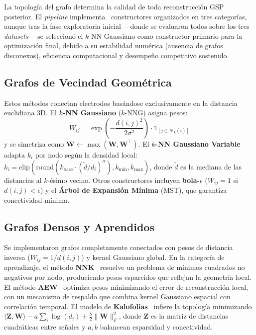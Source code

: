 La topología del grafo determina la calidad de toda reconstrucción GSP posterior. El \textit{pipeline} implementa \ResNGraphMethods~constructores organizados en tres categorías, aunque tras la fase exploratoria inicial —donde se evaluaron todos sobre los tres \textit{datasets}— se seleccionó el $k$-NN Gaussiano como constructor primario para la optimización final, debido a su estabilidad numérica (ausencia de grafos disconexos), eficiencia computacional y desempeño competitivo sostenido.

\subsection{Grafos de Vecindad Geométrica}

Estos métodos conectan electrodos basándose exclusivamente en la distancia euclidiana 3D. El \textbf{$k$-NN Gaussiano} ($k$-NNG) asigna pesos:
\begin{equation}
    W_{ij} = \exp\!\left(-\frac{d(i,j)^2}{2\sigma^2}\right) \cdot \mathbb{1}_{[j \in \mathcal{N}_k(i)]}
\end{equation}
y se simetriza como $\mathbf{W} \leftarrow \max(\mathbf{W}, \mathbf{W}^\top)$. El \textbf{$k$-NN Gaussiano Variable}~\cite{tamaru_optimizing_2024} adapta $k_i$ por nodo según la densidad local: $k_i = \text{clip}(\text{round}(k_{\text{base}} \cdot (\tilde{d}/d_i)^\alpha), k_{\min}, k_{\max})$, donde $\tilde{d}$ es la mediana de las distancias al $k$-ésimo vecino. Otros constructores incluyen \textbf{bola-$\epsilon$} ($W_{ij} = 1$ si $d(i,j) < \epsilon$) y el \textbf{Árbol de Expansión Mínima} (MST), que garantiza conectividad mínima.

\subsection{Grafos Densos y Aprendidos}

Se implementaron grafos completamente conectados con pesos de distancia inversa ($W_{ij} = 1/d(i,j)$) y kernel Gaussiano global. En la categoría de aprendizaje, el método \textbf{NNK}~\cite{shekkizhar2020} resuelve un problema de mínimos cuadrados no negativos por nodo, produciendo pesos esparcidos que reflejan la geometría local. El método \textbf{AEW}~\cite{karasuyama_adaptive_2017} optimiza pesos minimizando el error de reconstrucción local, con un mecanismo de respaldo que combina kernel Gaussiano espacial con correlación temporal. El modelo de \textbf{Kalofolias}~\cite{kalofolias_how_2016} infiere la topología minimizando $\langle \mathbf{Z}, \mathbf{W} \rangle - a \sum_i \log(d_i) + \frac{b}{2} \|\mathbf{W}\|_F^2$, donde $\mathbf{Z}$ es la matriz de distancias cuadráticas entre señales y $a, b$ balancean esparsidad y conectividad.


